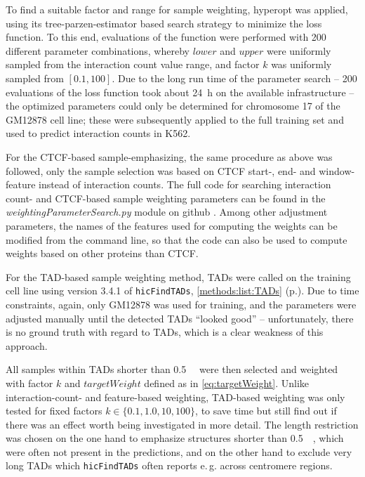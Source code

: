 To find a suitable factor and range for sample weighting, hyperopt \cite{Bergstra2011} was applied, 
using its tree-parzen-estimator based search strategy to minimize the loss function.
To this end, evaluations of the function were performed with 200 different parameter combinations,
whereby $lower$ and $upper$ were uniformly sampled from the interaction count value range,
and factor $k$ was uniformly sampled from $[0.1, 100]$.
Due to the long run time of the parameter search -- 200 evaluations of the loss function
took about \SI{24}{\hour} on the available infrastructure -- the optimized 
parameters could only be determined 
for chromosome 17 of the GM12878 cell line; 
these were subsequently applied to the full training set and used to predict interaction counts in K562.

For the CTCF-based sample-emphasizing, the same procedure as above was followed,
only the sample selection was based on CTCF start-, end- and window-feature instead of interaction counts.
The full code for searching interaction count- and CTCF-based sample weighting parameters
can be found in the \emph{weightingParameterSearch.py} module on github \cite{Krauth2020}.
Among other adjustment parameters, the names of the features used for computing the weights can be modified
from the command line, so that the code can also be used to compute weights based on other proteins than CTCF.

For the TAD-based sample weighting method, TADs were called on the training cell line using 
version 3.4.1 of \texttt{hicFindTADs}, \autoref{methods:list:TADs} (p.\;\pageref{methods:list:TADs}). 
Due to time constraints, again, only GM12878 was used for training, and the parameters
were adjusted manually until the detected TADs ``looked good'' -- unfortunately, there is 
no ground truth with regard to TADs, which is a clear weakness of this approach. 

All samples within TADs shorter than \SI{0.5}{\mega\bp} were then selected
and weighted with factor $k$ and $targetWeight$ defined as in \autoref{eq:targetWeight}.
Unlike interaction-count- and feature-based weighting, TAD-based weighting was only tested
for fixed factors $k\in\{0.1,1.0,10,100\}$, to save time but still find out if there was an effect 
worth being investigated in more detail.
The length restriction was chosen on the one hand to emphasize structures shorter than \SI{0.5}{\mega\bp}, which were
often not present in the predictions, and on the other hand to exclude very long TADs which
\texttt{hicFindTADs} often reports e.\,g. across centromere regions.

